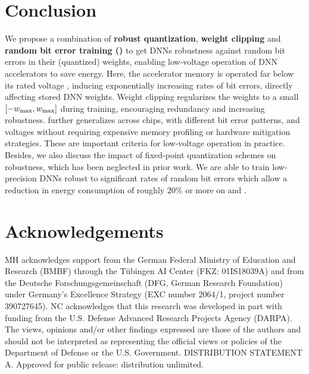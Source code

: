 \section{Conclusion}
\label{sec:conclusion}

We propose a combination of \textbf{robust quantization}, \textbf{weight clipping} and \textbf{random bit error training (\Random)} to get DNNs robustness against random bit errors in their (quantized) weights, enabling low-voltage operation of DNN accelerators to save energy. Here, the accelerator memory is operated far below its rated voltage \cite{ChandramoorthyHPCA2019,KoppulaMICRO2019,KimDATE2018}, inducing exponentially increasing rates of bit errors, directly affecting stored DNN weights. Weight clipping regularizes the weights to a small $[-\wmax, \wmax]$ during training, encouraging redundancy and increasing robustness. \Random further generalizes across chips, with different bit error patterns, and voltages without requiring expensive memory profiling or hardware mitigation strategies. These are important criteria for low-voltage operation in practice. Besides, we also discuss the impact of fixed-point quantization schemes on robustness, which has been neglected in prior work. We are able to train low-precision DNNs robust to significant rates of random bit errors which allow a reduction in energy consumption of roughly $20\%$ or more on \MNIST and \Cifar.
 
\section*{Acknowledgements}
%
MH acknowledges support from the German Federal Ministry of Education and Research
(BMBF) through the Tübingen AI Center (FKZ: 01IS18039A) and from the Deutsche Forschungsgemeinschaft
(DFG, German Research Foundation) under Germany’s Excellence Strategy (EXC number
2064/1, project number 390727645). 
NC acknowledges that this research was developed in part with funding from the U.S. Defense Advanced Research Projects Agency (DARPA). The views, opinions and/or other findings expressed are those of the authors and should not be interpreted as representing the official views or policies of the Department of Defense or the U.S. Government. DISTRIBUTION STATEMENT A. Approved for public release: distribution unlimited.